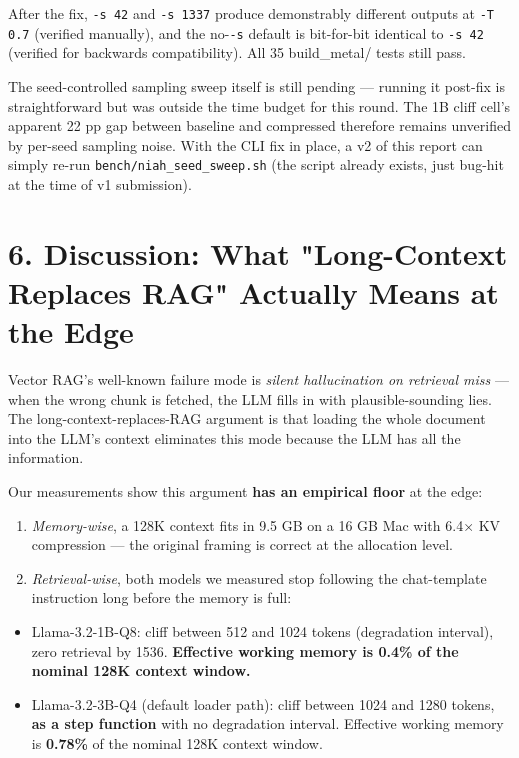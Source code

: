 \documentclass[11pt]{article}
\begin{document}
After the fix, \texttt{-s 42} and \texttt{-s 1337} produce demonstrably different outputs at \texttt{-T 0.7} (verified manually), and the no-\texttt{-s} default is bit-for-bit identical to \texttt{-s 42} (verified for backwards compatibility). All 35 build\_metal/ tests still pass.


The seed-controlled sampling sweep itself is still pending — running it post-fix is straightforward but was outside the time budget for this round. The 1B cliff cell's apparent 22 pp gap between baseline and compressed therefore remains unverified by per-seed sampling noise. With the CLI fix in place, a v2 of this report can simply re-run \texttt{bench/niah\_seed\_sweep.sh} (the script already exists, just bug-hit at the time of v1 submission).


\section*{6. Discussion: What "Long-Context Replaces RAG" Actually Means at the Edge}


Vector RAG's well-known failure mode is \textit{silent hallucination on retrieval miss} — when the wrong chunk is fetched, the LLM fills in with plausible-sounding lies. The long-context-replaces-RAG argument is that loading the whole document into the LLM's context eliminates this mode because the LLM has all the information.


Our measurements show this argument \textbf{has an empirical floor} at the edge:


\begin{enumerate}
\item \textit{Memory-wise}, a 128K context fits in 9.5 GB on a 16 GB Mac with 6.4× KV compression — the original framing is correct at the allocation level.
\item \textit{Retrieval-wise}, both models we measured stop following the chat-template instruction long before the memory is full:
\end{enumerate}

\begin{itemize}
\item Llama-3.2-1B-Q8: cliff between 512 and 1024 tokens (degradation interval), zero retrieval by 1536. \textbf{Effective working memory is 0.4\% of the nominal 128K context window.}
\item Llama-3.2-3B-Q4 (default loader path): cliff between 1024 and 1280 tokens, \textbf{as a step function} with no degradation interval. Effective working memory is \textbf{0.78\%} of the nominal 128K context window.
\end{itemize}
\end{document}
